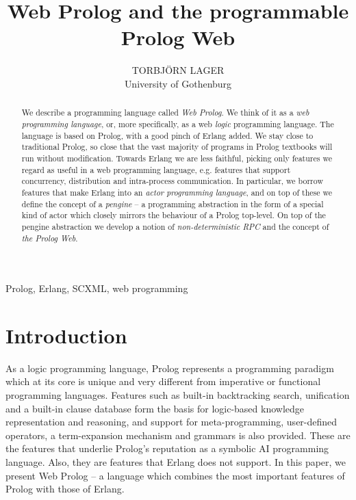 \documentclass{tlp}
\begin{document}


\title{Web Prolog and the programmable Prolog Web}


\author[T. Lager]
{TORBJ\"ORN LAGER \\
University of Gothenburg\\
}

\pagerange{\pageref{firstpage}--\pageref{lastpage}}
\setcounter{page}{1}

\maketitle
\begin{abstract}
We describe a programming language called \textit{Web Prolog}. We think of it as a \textit{web programming language}, or, more specifically, as a web \emph{logic} programming language. The language is based on Prolog, with a good pinch of Erlang added. We stay close to traditional Prolog, so close that the vast majority of programs in Prolog textbooks will run without modification. Towards Erlang we are less faithful, picking only features we regard as useful in a web programming language, e.g. features that support concurrency, distribution and intra-process communication. In particular, we borrow features that make Erlang into an \textit{actor programming language}, and on top of these we define the concept of a \textit{pengine} -- a programming abstraction in the form of a special kind of actor which closely mirrors the behaviour of a Prolog top-level. On top of the pengine abstraction we develop a notion of \textit{non-deterministic RPC} and the concept of \textit{the Prolog Web}.
\end{abstract}


\begin{keywords}
Prolog, Erlang, SCXML, web programming
\end{keywords}


\section{Introduction}

\noindent As a logic programming language, Prolog represents a programming paradigm which at its core is unique and very different from imperative or functional programming languages. Features such as built-in backtracking search, unification and a built-in clause database form the basis for logic-based knowledge representation and reasoning, and support for meta-programming, user-defined operators, a term-expansion mechanism and grammars is also provided. These are the features that underlie Prolog's reputation as a symbolic AI programming language. Also, they are features that Erlang does not support. In this paper, we present Web Prolog -- a language which combines the most important features of Prolog with those of Erlang.
\end{document}
